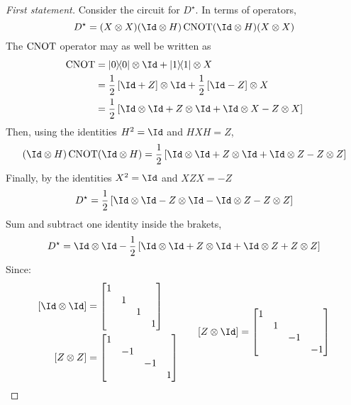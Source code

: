 \begin{proof}[First statement]
    Consider the circuit for $D^\star$. In terms of operators,
    \[
        D^\star = (X \otimes X) (\Id \otimes H) \cnot (\Id \otimes H) (X \otimes X)
    \]
    The $\operatorname{CNOT}$ operator may as well be written as
    \[
    \begin{aligned}
        \cnot &= \op{0} \otimes \Id + \op{1} \otimes X \\
        &= \frac{1}{2} \lrS{\Id + Z} \otimes \Id + \frac{1}{2} \lrS{\Id - Z} \otimes X \\
        &= \frac{1}{2} \lrS{\Id \otimes \Id + Z \otimes \Id + \Id \otimes X - Z \otimes X} 
    \end{aligned}
    \]
    Then, using the identities $H^2 = \Id$ and $HXH = Z$,
    \[
        (\Id \otimes H) \cnot (\Id \otimes H) = \frac{1}{2} \lrS{\Id \otimes \Id + Z \otimes \Id + \Id \otimes Z - Z \otimes Z} 
    \]
    Finally, by the identities $X^2=\Id$ and $XZX=-Z$
    \[
        D^\star = \frac{1}{2} \lrS{\Id \otimes \Id - Z \otimes \Id - \Id \otimes Z - Z \otimes Z}
    \]
    Sum and subtract one identity inside the brakets,
    \[
        D^\star = \Id \otimes \Id - \frac{1}{2} \lrS{\Id \otimes \Id + Z \otimes \Id + \Id \otimes Z + Z \otimes Z}
    \]
    Since:
    \[
    \begin{aligned}
        \lrS{\Id \otimes \Id} &= \begin{bmatrix}
            1 & & & \\
            & 1 & & \\
            & & 1 & \\
            & & & 1
        \end{bmatrix} \\ 
        \lrS{Z \otimes Z} &= \begin{bmatrix}
            1  &  & & \\
            & -1  & & \\
            &  & -1 & \\
            &  &  & 1
        \end{bmatrix}
    \end{aligned}
    \qquad
    \begin{aligned}
        \lrS{Z \otimes \Id} &= \begin{bmatrix}
            1 &  &  & \\
            & 1  &  & \\
            & & -1  & \\
            & &  & -1
        \end{bmatrix} \\

\end{aligned}\]
\end{proof}

